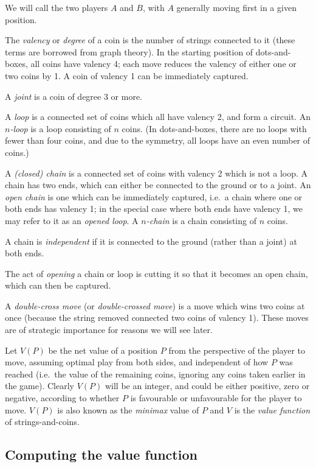\documentclass[a4paper,twocolumn]{article}
\begin{document}
We will call the two players $A$ and $B$, with $A$ generally moving
first in a given position.

The \emph{valency} or \emph{degree} of a coin is the number of strings
connected to it (these terms are borrowed from graph theory). In the
starting position of dots-and-boxes, all coins have valency 4; each
move reduces the valency of either one or two coins by 1. A coin of
valency 1 can be immediately captured.

A \emph{joint} is a coin of degree 3 or more.

A \emph{loop} is a connected set of coins which all have valency 2,
and form a circuit. An \emph{$n$-loop} is a loop consisting of $n$
coins. (In dots-and-boxes, there are no loops with fewer than four
coins, and due to the symmetry, all loops have an even number of
coins.)

A \emph{(closed) chain} is a connected set of coins with valency 2
which is not a loop. A chain has two ends, which can either be
connected to the ground or to a joint. An \emph{open chain} is one
which can be immediately captured, i.e.\ a chain where one or both
ends has valency 1; in the special case where both ends have valency
1, we may refer to it as an \emph{opened loop}. A \emph{$n$-chain} is
a chain consisting of $n$ coins.

A chain is \emph{independent} if it is connected to the ground (rather
than a joint) at both ends.

The act of \emph{opening} a chain or loop is cutting it so that it
becomes an open chain, which can then be captured.

A \emph{double-cross move} (or \emph{double-crossed move}) is a move
which wins two coins at once (because the string removed connected two
coins of valency 1). These moves are of strategic importance for
reasons we will see later.

Let $V(P)$ be the net value of a position $P$ from the perspective of
the player to move, assuming optimal play from both sides, and
independent of how $P$ was reached (i.e.\ the value of the remaining
coins, ignoring any coins taken earlier in the game). Clearly $V(P)$
will be an integer, and could be either positive, zero or negative,
according to whether $P$ is favourable or unfavourable for the player
to move. $V(P)$ is also known as the \emph{minimax} value of $P$ and
$V$ is the \emph{value function} of strings-and-coins.

\subsection*{Computing the value function}
\end{document}

